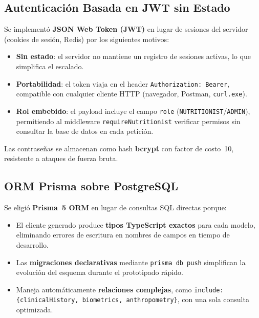 \documentclass[12pt,a4paper]{article}
\begin{document}
\subsection{Autenticación Basada en JWT sin Estado}

Se implementó \textbf{JSON Web Token (JWT)} en lugar de sesiones del servidor
(cookies de sesión, Redis) por los siguientes motivos:

\begin{itemize}[leftmargin=1.5em]
  \item \textbf{Sin estado}: el servidor no mantiene un registro de sesiones activas,
        lo que simplifica el escalado.
  \item \textbf{Portabilidad}: el token viaja en el header
        \texttt{Authorization: Bearer}, compatible con cualquier cliente HTTP
        (navegador, Postman, \texttt{curl.exe}).
  \item \textbf{Rol embebido}: el payload incluye el campo \texttt{role}
        (\texttt{NUTRITIONIST}/\texttt{ADMIN}), permitiendo al middleware
        \texttt{requireNutritionist} verificar permisos sin consultar la base de datos
        en cada petición.
\end{itemize}

Las contraseñas se almacenan como hash \textbf{bcrypt} con factor de costo~10,
resistente a ataques de fuerza bruta.

\subsection{ORM Prisma sobre PostgreSQL}

Se eligió \textbf{Prisma~5 ORM} en lugar de consultas SQL directas porque:

\begin{itemize}[leftmargin=1.5em]
  \item El cliente generado produce \textbf{tipos TypeScript exactos} para cada modelo,
        eliminando errores de escritura en nombres de campos en tiempo de desarrollo.
  \item Las \textbf{migraciones declarativas} mediante \texttt{prisma db push} simplifican
        la evolución del esquema durante el prototipado rápido.
  \item Maneja automáticamente \textbf{relaciones complejas}, como
        \texttt{include: \{clinicalHistory, biometrics, anthropometry\}}, con una
        sola consulta optimizada.
\end{itemize}
\end{document}
